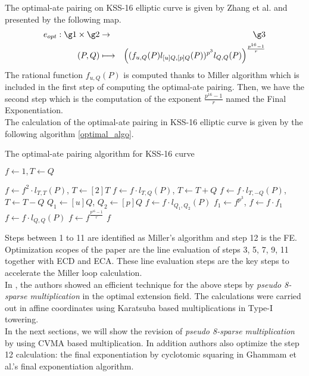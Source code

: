 The optimal-ate pairing on KSS-16 elliptic curve is given by Zhang et al. \cite{zhang_L12} and presented by the following map.
\begin{eqnarray*}
  e_{opt}: \g1\times \g2 &\rightarrow & \g3 \\
  (P,Q) &\longmapsto &\left(( f_{u,Q}(P)l_{[u]Q,[p]Q}(P))^{p^3}l_{Q,Q}(P)\right)^{\frac{p^{16}-1}{r}}
\end{eqnarray*}
The rational function $f_{u,Q}(P)$ is computed thanks to Miller algorithm which is included in the first step of computing the optimal-ate pairing. Then, we have the second step which is the computation of the exponent $\frac{p^{16}-1}{r}$ named the Final Exponentiation.\\
The calculation of the optimal-ate pairing in KSS-16 elliptic curve is given by the following algorithm \ref{optimal_algo}.
\begin{algorithm}[!h]
	\caption{The optimal-ate pairing algorithm for KSS-16 curve}
	\label{optimal_algo}
	\DontPrintSemicolon
	\hspace{-3ex}
	\hspace{-3ex}
	\nl $f \leftarrow 1,T \leftarrow Q$
	
	\nl {} {
		\nl $f\leftarrow f^2\cdot l_{T,T}(P)$, $T\leftarrow [2]T$ 
		\nl {} {
			\nl $f\leftarrow f\cdot l_{T,Q}(P)$, $T\leftarrow T+Q$ }
		\nl {} {
			\nl $f\leftarrow f\cdot l_{T,-Q}(P)$, $T\leftarrow T-Q$} } 
	\nl $Q_1\leftarrow [u]Q$, $Q_2\leftarrow [p]Q$ \;
	\nl $f\leftarrow f\cdot l_{Q_1,Q_2}(P)$ \;
	\nl $f_1\leftarrow f^{p^3}$, $f\leftarrow f\cdot f_1$ \;
	\nl $f\leftarrow f\cdot l_{Q,Q}(P)$ \;
	\nl $f\leftarrow f^{\frac{p^{16}-1}{r}}$\;
	 $f$\;
\end{algorithm}

Steps between  1 to 11 are identified as Miller's algorithm and step 12 is the FE.
Optimization scopes of the paper are the line evaluation of steps 3, 5, 7, 9, 11 together with ECD and ECA.
These line evaluation steps are the key steps to accelerate the Miller loop calculation. \\
In \cite{self_indo17}, the authors showed an efficient technique for the above steps by \textit{pseudo 8-sparse multiplication} in the optimal extension field. 
The calculations were carried out in affine coordinates using Karatsuba based multiplications in Type-I towering. \\
In the next sections, we will show the revision of \textit{pseudo 8-sparse multiplication} by using CVMA based multiplication.
In addition authors also optimize the step 12 calculation: the final exponentiation  by cyclotomic squaring \cite{cyclotomic_sqr} in Ghammam et al.'s \cite{loubna_kss16} final exponentiation algorithm.

